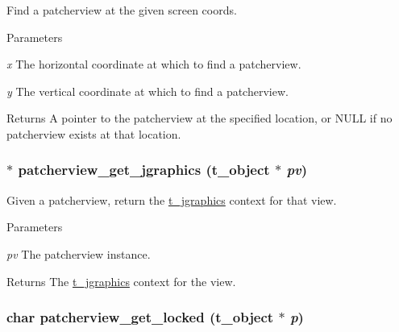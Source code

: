 Find a patcherview at the given screen coords. 
\begin{DoxyParams}{Parameters}
\item[{\em x}]The horizontal coordinate at which to find a patcherview. \item[{\em y}]The vertical coordinate at which to find a patcherview. \end{DoxyParams}
\begin{DoxyReturn}{Returns}
A pointer to the patcherview at the specified location, or NULL if no patcherview exists at that location. 
\end{DoxyReturn}
\hypertarget{group__jpatcherview_ga221544b77a5371897c96f2e94ae49c82}{
\subsubsection[{patcherview\_\-get\_\-jgraphics}]{$\ast$ patcherview\_\-get\_\-jgraphics ({\bf t\_\-object} $\ast$ {\em pv})}}
\label{group__jpatcherview_ga221544b77a5371897c96f2e94ae49c82}


Given a patcherview, return the \hyperlink{group__jgraphics_ga4bf27bd7e21a59a427481b909d4656e7}{t\_\-jgraphics} context for that view. 
\begin{DoxyParams}{Parameters}
\item[{\em pv}]The patcherview instance. \end{DoxyParams}
\begin{DoxyReturn}{Returns}
The \hyperlink{group__jgraphics_ga4bf27bd7e21a59a427481b909d4656e7}{t\_\-jgraphics} context for the view. 
\end{DoxyReturn}
\hypertarget{group__jpatcherview_ga1b78b4ec463f113a0c2778dbebcc8654}{
\subsubsection[{patcherview\_\-get\_\-locked}]{\setlength{\rightskip}{0pt plus 5cm}char patcherview\_\-get\_\-locked ({\bf t\_\-object} $\ast$ {\em p})}}
\label{group__jpatcherview_ga1b78b4ec463f113a0c2778dbebcc8654}


